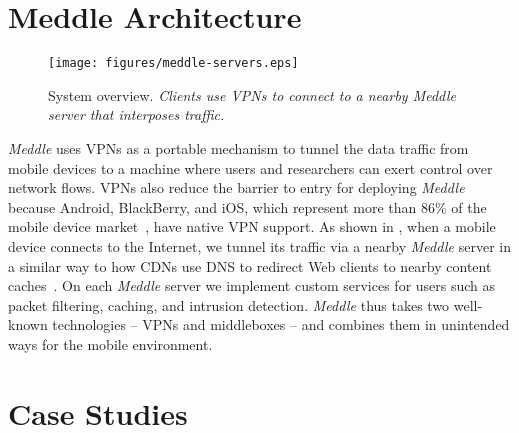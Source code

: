 \documentclass{sig-alternate}
\newcommand{\meddle}{{\em Meddle}\xspace}
\renewcommand{\fref}{\Fref}
\begin{document}
\section{Meddle Architecture}

\begin{figure}
  \centering
  \texttt{[image: figures/meddle-servers.eps]}
  \caption{System overview. \emph{Clients use VPNs to connect to a
      nearby \meddle server that interposes traffic.}} 
  \label{fig:MeddleDeployment}
\end{figure}

\meddle uses VPNs as a portable mechanism to tunnel the data traffic
from mobile devices to a machine where users and researchers can exert
control over network flows. VPNs also reduce the barrier to entry for
deploying \meddle because Android, BlackBerry, and iOS, which represent more than 86\% of
the mobile device market~\cite{gartner-phone-share}, have native VPN
support. As shown in \fref{fig:MeddleDeployment}, when a mobile device
connects to the Internet, we tunnel its traffic via a nearby \meddle
server in a similar way to how CDNs use DNS to redirect Web
clients to nearby content caches~\cite{akamai:cdn}. On each
\meddle server we implement custom services for users such as
packet filtering, caching, and intrusion detection. \meddle thus takes
two well-known technologies -- VPNs and middleboxes -- and combines
them in unintended ways for the mobile environment. 


\section{Case Studies}
\end{document}
